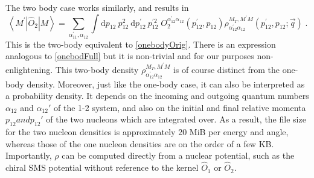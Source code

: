 \documentclass[a4paper,11pt]{article}
\newcommand\bv[1]{\vec{#1}}
\begin{document}
The two body case works similarly, and results in
\begin{equation}
  \left\langle M^{\prime}\left|\hat{O}_{2}\right| M\right\rangle =
  \sum_{\alpha_{11}^{\prime}, \alpha_{12}} \int \mathrm{d} p_{12}\:
  p_{12}^{2} \mathrm{~d} p_{12}^{\prime}\: p_{12}^{\prime 2}\;
  O_{2}^{\alpha_{12}^{\prime} \alpha_{12}}\left(p_{12}^{\prime},
  p_{12}\right) \rho_{\alpha_{12}^{\prime} \alpha_{12}}^{M_{T},
  M^{\prime} M}\left(p_{12}^{\prime}, p_{12} ; \bv{q}\right)\label{twobody}\;.
\end{equation}
This is the two-body equivalent to \eqref{onebodyOrig}.
There is an expression analogous to \eqref{onebodFull} but it is
non-trivial and for our purposes non-enlightening.
This two-body density $\rho_{\alpha_{12}^{\prime}
\alpha_{12}}^{M_{T}, M^{\prime} M}$ is of course distinct
from the one-body density.
Moreover, just like the one-body case, it can also be interpreted as a
probability density.
It depends on the incoming and outgoing quantum numbers
$\alpha_{12}$ and $\alpha_{12}'$ of the 1-2 system, and also on the initial and final
relative momenta $p_{12} and p_{12}'$ of the two nucleons which are integrated over.
As a result, the file size for the two nucleon densities is approximately 20 MiB
per energy and angle, whereas those of the one
nucleon densities are on the order of a few KB.
Importantly, $\rho$ can be computed directly from a nuclear
potential, such as the chiral SMS potential
\cite{Reinert2018}
without reference to the kernel $\hat{O}_1$ or $\hat{O}_{2}$.
\end{document}
